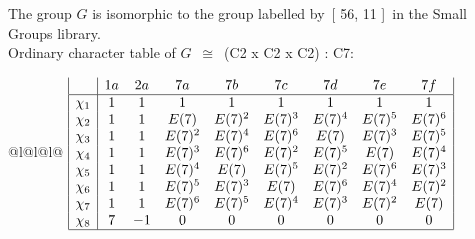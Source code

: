 \documentclass[varwidth=\maxdimen,border=10]{standalone}
\begin{document}
The group $G$ is isomorphic to the group labelled by\ [ 56, 11 ]\ in the Small Groups library.\\
Ordinary character table of $G$\ $\cong$\ (C2 x C2 x C2) : C7:\\
\begin{center}
\begin{tabular}{@{}l@{}l@{}l@{}}
\hline
\(\begin{array}{|l|cccccccc|}
  & 1a & 2a & 7a & 7b & 7c & 7d & 7e & 7f\\ \hline
\chi_{1} & 1 & 1 & 1 & 1 & 1 & 1 & 1 & 1\\
\chi_{2} & 1 & 1 & E(7) & E(7)^{2} & E(7)^{3} & E(7)^{4} & E(7)^{5} & E(7)^{6}\\
\chi_{3} & 1 & 1 & E(7)^{2} & E(7)^{4} & E(7)^{6} & E(7) & E(7)^{3} & E(7)^{5}\\
\chi_{4} & 1 & 1 & E(7)^{3} & E(7)^{6} & E(7)^{2} & E(7)^{5} & E(7) & E(7)^{4}\\
\chi_{5} & 1 & 1 & E(7)^{4} & E(7) & E(7)^{5} & E(7)^{2} & E(7)^{6} & E(7)^{3}\\
\chi_{6} & 1 & 1 & E(7)^{5} & E(7)^{3} & E(7) & E(7)^{6} & E(7)^{4} & E(7)^{2}\\
\chi_{7} & 1 & 1 & E(7)^{6} & E(7)^{5} & E(7)^{4} & E(7)^{3} & E(7)^{2} & E(7)\\
\chi_{8} & 7 & -1 & 0 & 0 & 0 & 0 & 0 & 0\\
\hline
\end{array}\)\\
\end{tabular}
\end{center}
\end{document}

